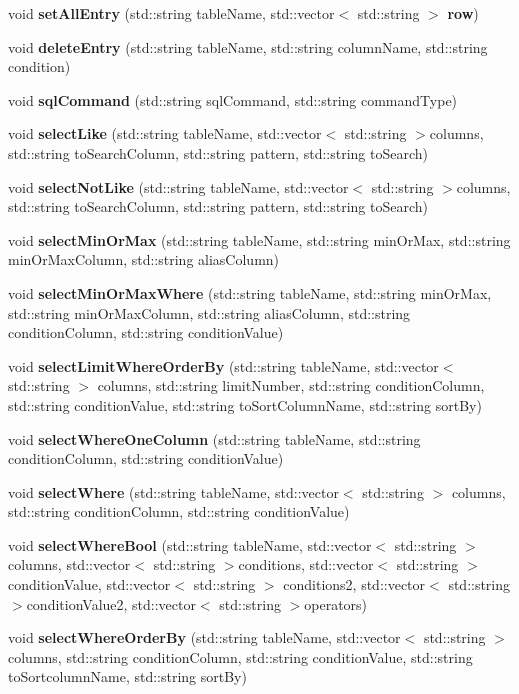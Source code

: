 \begin{DoxyCompactItemize}
\item 
void \textbf{ set\+All\+Entry} (std\+::string table\+Name, std\+::vector$<$ std\+::string $>$ \textbf{ row})
\item 
void \textbf{ delete\+Entry} (std\+::string table\+Name, std\+::string column\+Name, std\+::string condition)
\item 
void \textbf{ sql\+Command} (std\+::string sql\+Command, std\+::string command\+Type)
\item 
void \textbf{ select\+Like} (std\+::string table\+Name, std\+::vector$<$ std\+::string $>$columns, std\+::string to\+Search\+Column, std\+::string pattern, std\+::string to\+Search)
\item 
void \textbf{ select\+Not\+Like} (std\+::string table\+Name, std\+::vector$<$ std\+::string $>$columns, std\+::string to\+Search\+Column, std\+::string pattern, std\+::string to\+Search)
\item 
void \textbf{ select\+Min\+Or\+Max} (std\+::string table\+Name, std\+::string min\+Or\+Max, std\+::string min\+Or\+Max\+Column, std\+::string alias\+Column)
\item 
void \textbf{ select\+Min\+Or\+Max\+Where} (std\+::string table\+Name, std\+::string min\+Or\+Max, std\+::string min\+Or\+Max\+Column, std\+::string alias\+Column, std\+::string condition\+Column, std\+::string condition\+Value)
\item 
void \textbf{ select\+Limit\+Where\+Order\+By} (std\+::string table\+Name, std\+::vector$<$ std\+::string $>$ columns, std\+::string limit\+Number, std\+::string condition\+Column, std\+::string condition\+Value, std\+::string to\+Sort\+Column\+Name, std\+::string sort\+By)
\item 
void \textbf{ select\+Where\+One\+Column} (std\+::string table\+Name, std\+::string condition\+Column, std\+::string condition\+Value)
\item 
void \textbf{ select\+Where} (std\+::string table\+Name, std\+::vector$<$ std\+::string $>$ columns, std\+::string condition\+Column, std\+::string condition\+Value)
\item 
void \textbf{ select\+Where\+Bool} (std\+::string table\+Name, std\+::vector$<$ std\+::string $>$ columns, std\+::vector$<$ std\+::string $>$conditions, std\+::vector$<$ std\+::string $>$condition\+Value, std\+::vector$<$ std\+::string $>$ conditions2, std\+::vector$<$ std\+::string $>$condition\+Value2, std\+::vector$<$ std\+::string $>$operators)
\item 
void \textbf{ select\+Where\+Order\+By} (std\+::string table\+Name, std\+::vector$<$ std\+::string $>$ columns, std\+::string condition\+Column, std\+::string condition\+Value, std\+::string to\+Sortcolumn\+Name, std\+::string sort\+By)

\end{DoxyCompactItemize}
